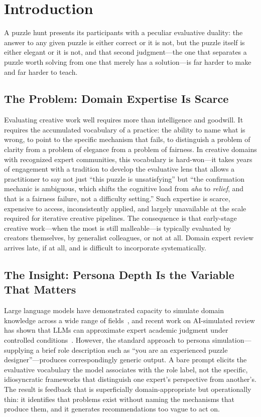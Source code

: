 \section{Introduction}

A puzzle hunt presents its participants with a peculiar evaluative duality: the answer to
any given puzzle is either correct or it is not, but the puzzle itself is either elegant or
it is not, and that second judgment---the one that separates a puzzle worth solving from one
that merely has a solution---is far harder to make and far harder to teach.

\subsection{The Problem: Domain Expertise Is Scarce}

Evaluating creative work well requires more than intelligence and goodwill. It requires the
accumulated vocabulary of a practice: the ability to name what is wrong, to point to the
specific mechanism that fails, to distinguish a problem of clarity from a problem of
elegance from a problem of fairness. In creative domains with recognized expert communities,
this vocabulary is hard-won---it takes years of engagement with a tradition to develop the
evaluative lens that allows a practitioner to say not just ``this puzzle is unsatisfying''
but ``the confirmation mechanic is ambiguous, which shifts the cognitive load from
\emph{aha} to \emph{relief}, and that is a fairness failure, not a difficulty setting.''
Such expertise is scarce, expensive to access, inconsistently applied, and largely
unavailable at the scale required for iterative creative pipelines. The consequence is that
early-stage creative work---when the most is still malleable---is typically evaluated by
creators themselves, by generalist colleagues, or not at all. Domain expert review arrives
late, if at all, and is difficult to incorporate systematically.

\subsection{The Insight: Persona Depth Is the Variable That Matters}

Large language models have demonstrated capacity to simulate domain knowledge across a wide
range of fields~\cite{park2023generative}, and recent work on AI-simulated review has
shown that LLMs can approximate expert academic judgment under controlled
conditions~\cite{shah2023llm,dellaLibera2025profiles}. However, the standard approach to
persona simulation---supplying a brief role description such as ``you are an experienced
puzzle designer''---produces correspondingly generic output. A bare prompt elicits the
evaluative vocabulary the model associates with the role label, not the specific,
idiosyncratic frameworks that distinguish one expert's perspective from another's. The
result is feedback that is superficially domain-appropriate but operationally thin: it
identifies that problems exist without naming the mechanisms that produce them, and it
generates recommendations too vague to act on.

